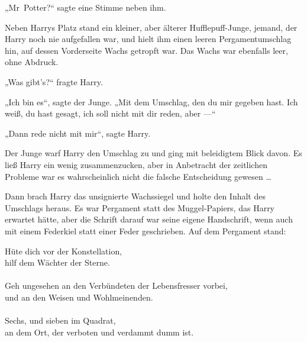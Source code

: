 „Mr~Potter?“ sagte eine Stimme neben ihm.

Neben Harrys Platz stand ein kleiner, aber älterer Hufflepuff-Junge, jemand, der Harry noch nie aufgefallen war, und hielt ihm einen leeren Pergamentumschlag hin, auf dessen Vorderseite Wachs getropft war. Das Wachs war ebenfalls leer, ohne Abdruck.

„Was gibt’s?“ fragte Harry.

„Ich bin es“, sagte der Junge.
„Mit dem Umschlag, den du mir gegeben hast. Ich weiß, du hast gesagt, ich soll nicht mit dir reden, aber —“

„Dann rede nicht mit mir“, sagte Harry.

Der Junge warf Harry den Umschlag zu und ging mit beleidigtem Blick davon. Es ließ Harry ein wenig zusammenzucken, aber in Anbetracht der zeitlichen Probleme war es wahrscheinlich nicht die falsche Entscheidung gewesen …

Dann brach Harry das unsignierte Wachssiegel und holte den Inhalt des Umschlags heraus. Es war Pergament statt des Muggel-Papiers, das Harry erwartet hätte, aber die Schrift darauf war seine eigene Handschrift, wenn auch mit einem Federkiel statt einer Feder geschrieben. Auf dem Pergament stand:

\begin{writtenNote}
Hüte dich vor der Konstellation,\\
hilf dem Wächter der Sterne.\\
\\
Geh ungesehen an den Verbündeten der Lebensfresser vorbei,\\
und an den Weisen und Wohlmeinenden.\\
\\
Sechs, und sieben im Quadrat,\\
an dem Ort, der verboten und verdammt dumm ist.
\end{writtenNote}

